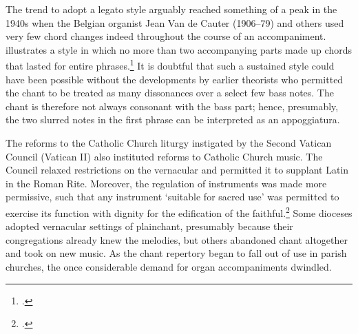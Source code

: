 The trend to adopt a legato style arguably reached something of a peak in the 1940s when the Belgian organist
Jean Van de Cauter (1906--79) and others used very few chord changes indeed throughout the course of an accompaniment.
 illustrates a style in which no more than two accompanying parts made up chords that lasted for entire phrases.\footcites[10]{VandeCauterOrganumpulsantisad1944}[See also an early attempt at codifying such a sparse style in][160]{GastoueTraiteharmonisationchant1910}
It is doubtful that such a sustained style could have been possible without the developments by earlier theorists who permitted the chant to be treated as many dissonances over a select few bass notes.
The chant is therefore not always consonant with the bass part; hence, presumably, the two slurred notes in the first phrase can be interpreted as an appoggiatura.

The reforms to the Catholic Church liturgy instigated by the Second Vatican Council (Vatican II) also instituted reforms to Catholic Church music.
The Council relaxed restrictions on the vernacular and permitted it to supplant Latin in the Roman Rite.
Moreover, the regulation of instruments was made more permissive, such that any instrument `suitable for sacred use' was permitted to exercise its function with dignity for the edification of the faithful.\footcite[383--4]{HayburnPapalLegislationSacred1979}
Some dioceses adopted vernacular settings of plainchant, presumably because their congregations already knew the melodies, but others abandoned chant altogether and took on new music.
As the chant repertory began to fall out of use in parish churches, the once considerable demand for organ accompaniments dwindled.
